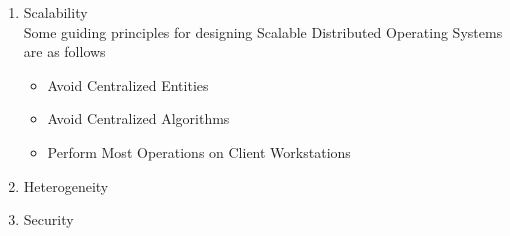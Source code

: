 \documentclass{beamer}
\begin{document}
\begin{frame}[allowframebreaks]
\begin{enumerate}
      		\framebreak
      	\item Scalability\\
      		\vspace{0.5cm}
      		Some guiding principles for designing Scalable Distributed Operating Systems are as follows
      		\begin{itemize}
      			\item Avoid Centralized Entities
      			\item Avoid Centralized Algorithms
      			\item Perform Most Operations on Client Workstations
      		\end{itemize}
      		\vspace{1cm}
      	\item Heterogeneity
      	\item Security
    \end{enumerate}   
    \vspace{2cm}
\end{frame} 
\end{document}
